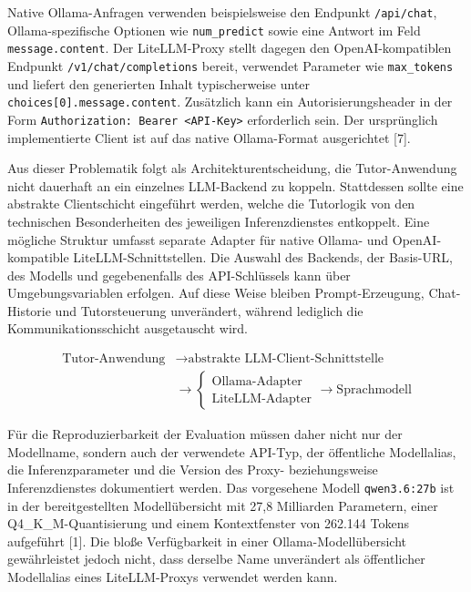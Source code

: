 Native Ollama-Anfragen verwenden beispielsweise den Endpunkt \texttt{/api/chat}, Ollama-spezifische Optionen wie \texttt{num\_predict} sowie eine Antwort im Feld \texttt{message.content}. Der LiteLLM-Proxy stellt dagegen den OpenAI-kompatiblen Endpunkt \texttt{/v1/chat/completions} bereit, verwendet Parameter wie \texttt{max\_tokens} und liefert den generierten Inhalt typischerweise unter \texttt{choices[0].message.content}. Zusätzlich kann ein Autorisierungsheader in der Form \texttt{Authorization: Bearer <API-Key>} erforderlich sein. Der ursprünglich implementierte Client ist auf das native Ollama-Format ausgerichtet [7].

Aus dieser Problematik folgt als Architekturentscheidung, die Tutor-Anwendung nicht dauerhaft an ein einzelnes LLM-Backend zu koppeln. Stattdessen sollte eine abstrakte Clientschicht eingeführt werden, welche die Tutorlogik von den technischen Besonderheiten des jeweiligen Inferenzdienstes entkoppelt. Eine mögliche Struktur umfasst separate Adapter für native Ollama- und OpenAI-kompatible LiteLLM-Schnittstellen. Die Auswahl des Backends, der Basis-URL, des Modells und gegebenenfalls des API-Schlüssels kann über Umgebungsvariablen erfolgen. Auf diese Weise bleiben Prompt-Erzeugung, Chat-Historie und Tutorsteuerung unverändert, während lediglich die Kommunikationsschicht ausgetauscht wird.

\[
\begin{aligned}
\text{Tutor-Anwendung}
&\rightarrow \text{abstrakte LLM-Client-Schnittstelle} \\
&\rightarrow
\begin{cases}
\text{Ollama-Adapter} \\
\text{LiteLLM-Adapter}
\end{cases}
\rightarrow \text{Sprachmodell}
\end{aligned}
\]

Für die Reproduzierbarkeit der Evaluation müssen daher nicht nur der Modellname, sondern auch der verwendete API-Typ, der öffentliche Modellalias, die Inferenzparameter und die Version des Proxy- beziehungsweise Inferenzdienstes dokumentiert werden. Das vorgesehene Modell \texttt{qwen3.6:27b} ist in der bereitgestellten Modellübersicht mit 27,8 Milliarden Parametern, einer Q4\_K\_M-Quantisierung und einem Kontextfenster von 262.144 Tokens aufgeführt [1]. Die bloße Verfügbarkeit in einer Ollama-Modellübersicht gewährleistet jedoch nicht, dass derselbe Name unverändert als öffentlicher Modellalias eines LiteLLM-Proxys verwendet werden kann.

